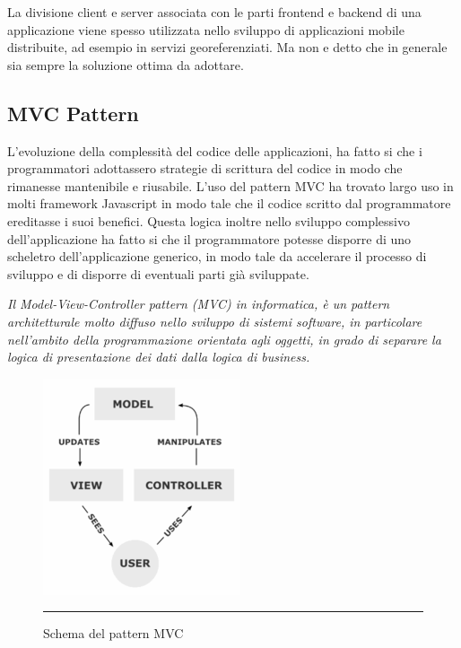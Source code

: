 La divisione client e server associata con le parti frontend e backend di una applicazione viene spesso utilizzata nello sviluppo di applicazioni mobile distribuite, ad esempio in servizi georeferenziati. Ma non e detto che in generale sia sempre la soluzione ottima da adottare. 

\subsection{MVC Pattern}
\label{subsec:mvc}

L'evoluzione della complessità del codice delle applicazioni, ha fatto si che i programmatori adottassero strategie di scrittura del codice in modo che rimanesse mantenibile e riusabile. L'uso del pattern MVC ha trovato largo uso in molti framework Javascript in modo tale che il codice scritto dal programmatore ereditasse i suoi benefici. Questa logica inoltre nello sviluppo complessivo dell'applicazione ha fatto si che il programmatore potesse disporre di uno scheletro dell'applicazione generico, in modo tale da accelerare il processo di sviluppo e di disporre di eventuali parti già sviluppate.

\emph{Il Model-View-Controller pattern (MVC) in informatica, è un pattern architetturale molto diffuso nello sviluppo di sistemi software, in particolare nell'ambito della programmazione orientata agli oggetti, in grado di separare la logica di presentazione dei dati dalla logica di business.}

\begin{figure}[htbp]
  \centering
    \includegraphics[scale=0.75]{Figures/mvc.png}  
    \rule{35em}{0.5pt}
  \caption[MVC Pattern]{Schema del pattern MVC}
  \label{fig:MVC Schema}
\end{figure}

